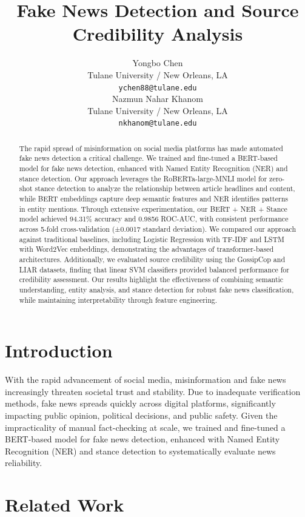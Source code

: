 \documentclass[11pt,a4paper]{article}
\title{Fake News Detection and Source Credibility Analysis}
\author{Yongbo Chen \\
  Tulane University / New Orleans, LA \\
  \texttt{ychen88@tulane.edu} \\\And
  Nazmun Nahar Khanom \\
  Tulane University / New Orleans, LA \\
  \texttt{nkhanom@tulane.edu} \\}
\date{}
\begin{document}
\maketitle

\begin{abstract}
The rapid spread of misinformation on social media platforms has made automated fake news detection a critical challenge. We trained and fine-tuned a BERT-based model for fake news detection, enhanced with Named Entity Recognition (NER) and stance detection. Our approach leverages the RoBERTa-large-MNLI model for zero-shot stance detection to analyze the relationship between article headlines and content, while BERT embeddings capture deep semantic features and NER identifies patterns in entity mentions. Through extensive experimentation, our BERT + NER + Stance model achieved 94.31\% accuracy and 0.9856 ROC-AUC, with consistent performance across 5-fold cross-validation (±0.0017 standard deviation). We compared our approach against traditional baselines, including Logistic Regression with TF-IDF and LSTM with Word2Vec embeddings, demonstrating the advantages of transformer-based architectures. Additionally, we evaluated source credibility using the GossipCop and LIAR datasets, finding that linear SVM classifiers provided balanced performance for credibility assessment. Our results highlight the effectiveness of combining semantic understanding, entity analysis, and stance detection for robust fake news classification, while maintaining interpretability through feature engineering.
\end{abstract}

\section{Introduction}

With the rapid advancement of social media, misinformation and fake news increasingly threaten societal trust and stability. 
Due to inadequate verification methods, fake news spreads quickly across digital platforms, significantly impacting public opinion, political decisions, and public safety. 
Given the impracticality of manual fact-checking at scale, we trained and fine-tuned a BERT-based model for fake news detection, enhanced with Named Entity Recognition (NER) and stance detection to systematically evaluate news reliability.

\section{Related Work}
\end{document}
